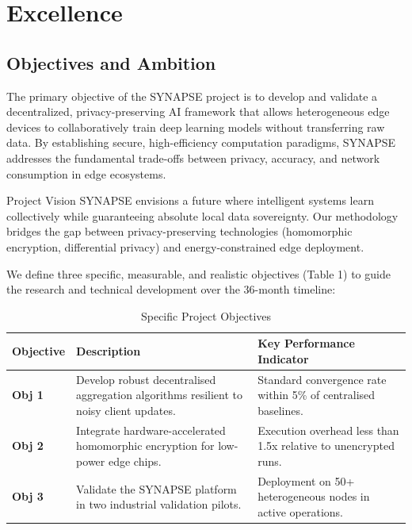 \section{Excellence}
\label{sec:excellence}

\subsection{Objectives and Ambition}
\label{sec:objectives}

The primary objective of the SYNAPSE project is to develop and validate a decentralized, privacy-preserving AI framework that allows heterogeneous edge devices to collaboratively train deep learning models without transferring raw data. By establishing secure, high-efficiency computation paradigms, SYNAPSE addresses the fundamental trade-offs between privacy, accuracy, and network consumption in edge ecosystems.

\begin{calloutbox}{Project Vision}
    SYNAPSE envisions a future where intelligent systems learn collectively while guaranteeing absolute local data sovereignty. Our methodology bridges the gap between privacy-preserving technologies (homomorphic encryption, differential privacy) and energy-constrained edge deployment.
\end{calloutbox}

We define three specific, measurable, and realistic objectives (Table 1) to guide the research and technical development over the 36-month timeline:

\begin{table}[h]
\caption{Specific Project Objectives}
\label{tab:objectives}
\begin{tabularx}{\textwidth}{p{2cm} X p{4.5cm}}
\toprule
\textbf{Objective} & \textbf{Description} & \textbf{Key Performance Indicator} \\
\midrule
\textbf{Obj 1} & Develop robust decentralised aggregation algorithms resilient to noisy client updates. & Standard convergence rate within 5\% of centralised baselines. \\
\textbf{Obj 2} & Integrate hardware-accelerated homomorphic encryption for low-power edge chips. & Execution overhead less than 1.5x relative to unencrypted runs. \\
\textbf{Obj 3} & Validate the SYNAPSE platform in two industrial validation pilots. & Deployment on 50+ heterogeneous nodes in active operations. \\
\bottomrule
\end{tabularx}
\end{table}

